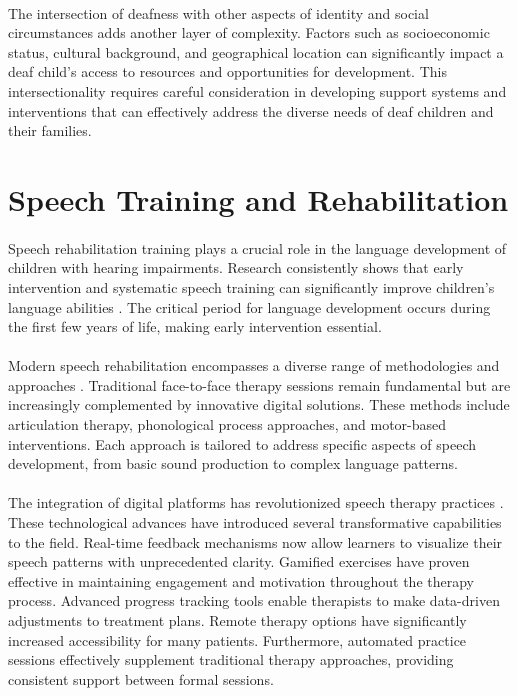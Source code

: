 \paragraph{}
The intersection of deafness with other aspects of identity and social circumstances adds another layer of complexity. Factors such as socioeconomic status, cultural background, and geographical location can significantly impact a deaf child's access to resources and opportunities for development. This intersectionality requires careful consideration in developing support systems and interventions that can effectively address the diverse needs of deaf children and their families.

\section{Speech Training and Rehabilitation}
\label{sec:speech_training}

\paragraph{}
Speech rehabilitation training plays a crucial role in the language development of children with hearing impairments. Research consistently shows that early intervention and systematic speech training can significantly improve children's language abilities \cite{early2021}. The critical period for language development occurs during the first few years of life, making early intervention essential.

\paragraph{}
Modern speech rehabilitation encompasses a diverse range of methodologies and approaches \cite{speech_methods2023}. Traditional face-to-face therapy sessions remain fundamental but are increasingly complemented by innovative digital solutions. These methods include articulation therapy, phonological process approaches, and motor-based interventions. Each approach is tailored to address specific aspects of speech development, from basic sound production to complex language patterns.

\paragraph{}
The integration of digital platforms has revolutionized speech therapy practices \cite{digital_therapy2022}. These technological advances have introduced several transformative capabilities to the field. Real-time feedback mechanisms now allow learners to visualize their speech patterns with unprecedented clarity. Gamified exercises have proven effective in maintaining engagement and motivation throughout the therapy process. Advanced progress tracking tools enable therapists to make data-driven adjustments to treatment plans. Remote therapy options have significantly increased accessibility for many patients. Furthermore, automated practice sessions effectively supplement traditional therapy approaches, providing consistent support between formal sessions.

